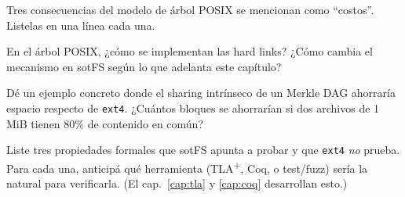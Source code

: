 \begin{ejercicio}[\dificultad{$\star$}]
\label{ej:intro-2}
Tres consecuencias del modelo de árbol POSIX se mencionan como ``costos''.
Listelas en una línea cada una.
\end{ejercicio}

\begin{ejercicio}[\dificultad{$\star\star$}]
\label{ej:intro-3}
En el árbol POSIX, ¿cómo se implementan las hard links? ¿Cómo cambia el
mecanismo en sotFS según lo que adelanta este capítulo?
\end{ejercicio}

\begin{ejercicio}[\dificultad{$\star\star$}]
\label{ej:intro-4}
Dé un ejemplo concreto donde el sharing intrínseco de un Merkle DAG
ahorraría espacio respecto de \texttt{ext4}. ¿Cuántos bloques se
ahorrarían si dos archivos de 1\,MiB tienen 80\% de contenido en común?
\end{ejercicio}

\begin{ejercicio}[\dificultad{$\star\star\star$}]
\label{ej:intro-5}
Liste tres propiedades formales que sotFS apunta a probar y que
\texttt{ext4} \emph{no} prueba. Para cada una, anticipá qué herramienta
(TLA\textsuperscript{+}, Coq, o test/fuzz) sería la natural para
verificarla. (El cap.~\ref{cap:tla} y \ref{cap:coq} desarrollan esto.)
\end{ejercicio}
